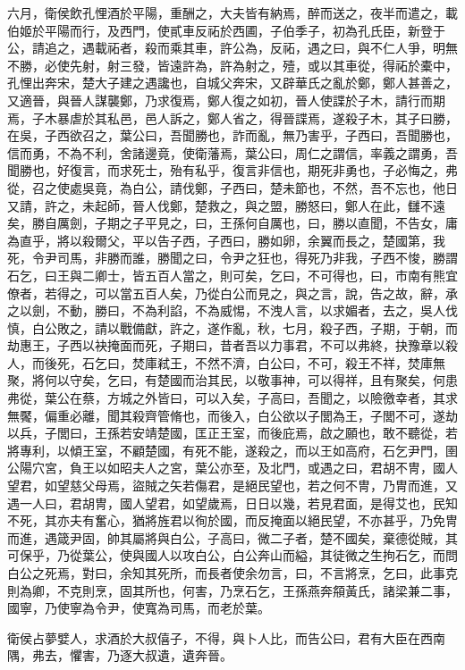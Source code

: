 \begin{pinyinscope}
六月，衛侯飲孔悝酒於平陽，重酬之，大夫皆有納焉，醉而送之，夜半而遣之，載伯姬於平陽而行，及西門，使貳車反祏於西圃，子伯季子，初為孔氏臣，新登于公，請追之，遇載祏者，殺而乘其車，許公為，反祏，遇之曰，與不仁人爭，明無不勝，必使先射，射三發，皆遠許為，許為射之，殪，或以其車從，得祏於橐中，孔悝出奔宋，楚大子建之遇讒也，自城父奔宋，又辟華氏之亂於鄭，鄭人甚善之，又適晉，與晉人謀襲鄭，乃求復焉，鄭人復之如初，晉人使諜於子木，請行而期焉，子木暴虐於其私邑，邑人訴之，鄭人省之，得晉諜焉，遂殺子木，其子曰勝，在吳，子西欲召之，葉公曰，吾聞勝也，詐而亂，無乃害乎，子西曰，吾聞勝也，信而勇，不為不利，舍諸邊竟，使衛藩焉，葉公曰，周仁之謂信，率義之謂勇，吾聞勝也，好復言，而求死士，殆有私乎，復言非信也，期死非勇也，子必悔之，弗從，召之使處吳竟，為白公，請伐鄭，子西曰，楚未節也，不然，吾不忘也，他日又請，許之，未起師，晉人伐鄭，楚救之，與之盟，勝怒曰，鄭人在此，讎不遠矣，勝自厲劍，子期之子平見之，曰，王孫何自厲也，曰，勝以直聞，不告女，庸為直乎，將以殺爾父，平以告子西，子西曰，勝如卵，余翼而長之，楚國第，我死，令尹司馬，非勝而誰，勝聞之曰，令尹之狂也，得死乃非我，子西不悛，勝謂石乞，曰王與二卿士，皆五百人當之，則可矣，乞曰，不可得也，曰，市南有熊宜僚者，若得之，可以當五百人矣，乃從白公而見之，與之言，說，告之故，辭，承之以劍，不動，勝曰，不為利諂，不為威惕，不洩人言，以求媚者，去之，吳人伐慎，白公敗之，請以戰備獻，許之，遂作亂，秋，七月，殺子西，子期，于朝，而劫惠王，子西以袂掩面而死，子期曰，昔者吾以力事君，不可以弗終，抉豫章以殺人，而後死，石乞曰，焚庫弒王，不然不濟，白公曰，不可，殺王不祥，焚庫無聚，將何以守矣，乞曰，有楚國而治其民，以敬事神，可以得祥，且有聚矣，何患弗從，葉公在蔡，方城之外皆曰，可以入矣，子高曰，吾聞之，以險徼幸者，其求無饜，偏重必離，聞其殺齊管脩也，而後入，白公欲以子閭為王，子閭不可，遂劫以兵，子閭曰，王孫若安靖楚國，匡正王室，而後庇焉，啟之願也，敢不聽從，若將專利，以傾王室，不顧楚國，有死不能，遂殺之，而以王如高府，石乞尹門，圉公陽穴宮，負王以如昭夫人之宮，葉公亦至，及北門，或遇之曰，君胡不冑，國人望君，如望慈父母焉，盜賊之矢若傷君，是絕民望也，若之何不冑，乃冑而進，又遇一人曰，君胡冑，國人望君，如望歲焉，日日以幾，若見君面，是得艾也，民知不死，其亦夫有奮心，猶將旌君以徇於國，而反掩面以絕民望，不亦甚乎，乃免冑而進，遇箴尹固，帥其屬將與白公，子高曰，微二子者，楚不國矣，棄德從賊，其可保乎，乃從葉公，使與國人以攻白公，白公奔山而縊，其徒微之生拘石乞，而問白公之死焉，對曰，余知其死所，而長者使余勿言，曰，不言將烹，乞曰，此事克則為卿，不克則烹，固其所也，何害，乃烹石乞，王孫燕奔頯黃氏，諸梁兼二事，國寧，乃使寧為令尹，使寬為司馬，而老於葉。

衛侯占夢嬖人，求酒於大叔僖子，不得，與卜人比，而告公曰，君有大臣在西南隅，弗去，懼害，乃逐大叔遺，遺奔晉。


\end{pinyinscope}
